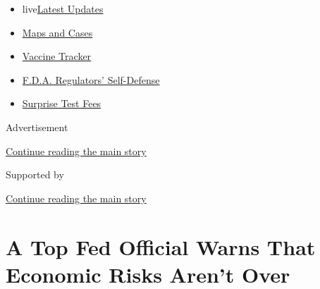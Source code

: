 \begin{itemize}
\tightlist
\item
  live\href{https://www.nytimes3xbfgragh.onion/2020/09/11/world/covid-19-coronavirus.html?name=styln-coronavirus-markets\&region=TOP_BANNER\&block=storyline_menu_recirc\&action=click\&pgtype=Article\&impression_id=08a3a191-f4b9-11ea-a720-afe8ca437054\&variant=undefined}{Latest
  Updates}
\item
  \href{https://www.nytimes3xbfgragh.onion/interactive/2020/us/coronavirus-us-cases.html?name=styln-coronavirus-markets\&region=TOP_BANNER\&block=storyline_menu_recirc\&action=click\&pgtype=Article\&impression_id=08a3a192-f4b9-11ea-a720-afe8ca437054\&variant=undefined}{Maps
  and Cases}
\item
  \href{https://www.nytimes3xbfgragh.onion/interactive/2020/science/coronavirus-vaccine-tracker.html?name=styln-coronavirus-markets\&region=TOP_BANNER\&block=storyline_menu_recirc\&action=click\&pgtype=Article\&impression_id=08a3a193-f4b9-11ea-a720-afe8ca437054\&variant=undefined}{Vaccine
  Tracker}
\item
  \href{https://www.nytimes3xbfgragh.onion/2020/09/10/us/politics/fda-coronavirus-vaccine.html?name=styln-coronavirus-markets\&region=TOP_BANNER\&block=storyline_menu_recirc\&action=click\&pgtype=Article\&impression_id=08a3a194-f4b9-11ea-a720-afe8ca437054\&variant=undefined}{F.D.A.
  Regulators' Self-Defense}
\item
  \href{https://www.nytimes3xbfgragh.onion/2020/09/09/upshot/coronavirus-surprise-test-fees.html?name=styln-coronavirus-markets\&region=TOP_BANNER\&block=storyline_menu_recirc\&action=click\&pgtype=Article\&impression_id=08a3a195-f4b9-11ea-a720-afe8ca437054\&variant=undefined}{Surprise
  Test Fees}
\end{itemize}

Advertisement

\protect\hyperlink{after-top}{Continue reading the main story}

Supported by

\protect\hyperlink{after-sponsor}{Continue reading the main story}

\hypertarget{a-top-fed-official-warns-that-economic-risks-arent-over}{%
\section{A Top Fed Official Warns That Economic Risks Aren't
Over}\label{a-top-fed-official-warns-that-economic-risks-arent-over}}

